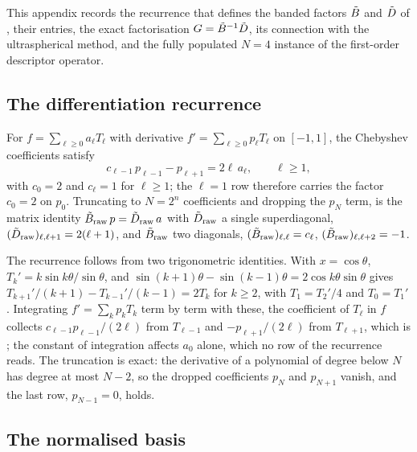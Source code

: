 This appendix records the recurrence that defines the banded factors $\tilde{B}$ and $\tilde{D}$ of , their entries, the exact factorisation $G = \tilde{B}^{-1}\tilde{D}$, its connection with the ultraspherical method, and the fully populated $N = 4$ instance of the first-order descriptor operator.

\subsection{The differentiation recurrence}

For $f = \sum_{\ell\ge 0} a_\ell T_\ell$ with derivative $f' = \sum_{\ell\ge 0} p_\ell T_\ell$ on
$[-1,1]$, the Chebyshev coefficients satisfy
\begin{equation}
    c_{\ell-1}\,p_{\ell-1} - p_{\ell+1} = 2\ell\,a_\ell , \qquad \ell \ge 1 ,
    \label{eq:app-cheb-recurrence}
\end{equation}
with $c_0 = 2$ and $c_\ell = 1$ for $\ell \ge 1$; the $\ell = 1$ row therefore carries the
factor $c_0 = 2$ on $p_0$. Truncating to $N = 2^n$ coefficients and dropping the
$p_N$ term,  is the matrix identity
$\tilde{B}_{\mathrm{raw}}\,p = \tilde{D}_{\mathrm{raw}}\,a$ with
$\tilde{D}_{\mathrm{raw}}$ a single superdiagonal, $(\tilde{D}_{\mathrm{raw}})_{\ell,\ell+1} = 2(\ell+1)$,
and $\tilde{B}_{\mathrm{raw}}$ two diagonals,
$(\tilde{B}_{\mathrm{raw}})_{\ell,\ell} = c_\ell$, $(\tilde{B}_{\mathrm{raw}})_{\ell,\ell+2} = -1$.

The recurrence follows from two trigonometric identities. With $x=\cos\theta$, $T_k'=k\sin k\theta/\sin\theta$, and $\sin(k+1)\theta-\sin(k-1)\theta=2\cos k\theta\sin\theta$ gives $T_{k+1}'/(k+1)-T_{k-1}'/(k-1)=2T_k$ for $k\ge2$, with $T_1=T_2'/4$ and $T_0=T_1'$. Integrating $f'=\sum_kp_kT_k$ term by term with these, the coefficient of $T_\ell$ in $f$ collects $c_{\ell-1}p_{\ell-1}/(2\ell)$ from $T_{\ell-1}$ and $-p_{\ell+1}/(2\ell)$ from $T_{\ell+1}$, which is ; the constant of integration affects $a_0$ alone, which no row of the recurrence reads. The truncation is exact: the derivative of a polynomial of degree below $N$ has degree at most $N-2$, so the dropped coefficients $p_N$ and $p_{N+1}$ vanish, and the last row, $p_{N-1}=0$, holds.

\subsection{The normalised basis}

